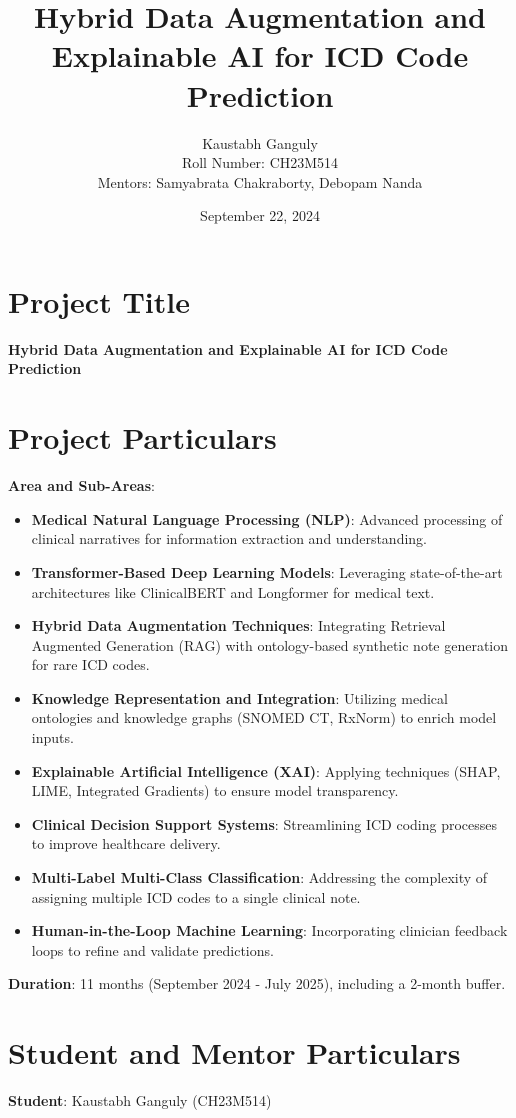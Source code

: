 \documentclass[10pt,a4paper]{article}
\title{Hybrid Data Augmentation and Explainable AI for ICD Code Prediction}
\author{
    Kaustabh Ganguly \\
    Roll Number: CH23M514 \\
    Mentors: Samyabrata Chakraborty, Debopam Nanda \\
}
\date{September 22, 2024}
\begin{document}
\maketitle

\section{Project Title}
\textbf{Hybrid Data Augmentation and Explainable AI for ICD Code Prediction}

\section{Project Particulars}
\textbf{Area and Sub-Areas}: 
\begin{itemize}
    \item \textbf{Medical Natural Language Processing (NLP)}: Advanced processing of clinical narratives for information extraction and understanding.
    \item \textbf{Transformer-Based Deep Learning Models}: Leveraging state-of-the-art architectures like ClinicalBERT and Longformer for medical text.
    \item \textbf{Hybrid Data Augmentation Techniques}: Integrating Retrieval Augmented Generation (RAG) with ontology-based synthetic note generation for rare ICD codes.
    \item \textbf{Knowledge Representation and Integration}: Utilizing medical ontologies and knowledge graphs (SNOMED CT, RxNorm) to enrich model inputs.
    \item \textbf{Explainable Artificial Intelligence (XAI)}: Applying techniques (SHAP, LIME, Integrated Gradients) to ensure model transparency.
    \item \textbf{Clinical Decision Support Systems}: Streamlining ICD coding processes to improve healthcare delivery.
    \item \textbf{Multi-Label Multi-Class Classification}: Addressing the complexity of assigning multiple ICD codes to a single clinical note.
    \item \textbf{Human-in-the-Loop Machine Learning}: Incorporating clinician feedback loops to refine and validate predictions.
\end{itemize}

\textbf{Duration}: 11 months (September 2024 - July 2025), including a 2-month buffer.

\section{Student and Mentor Particulars}
\textbf{Student}: Kaustabh Ganguly (CH23M514)
\end{document}
